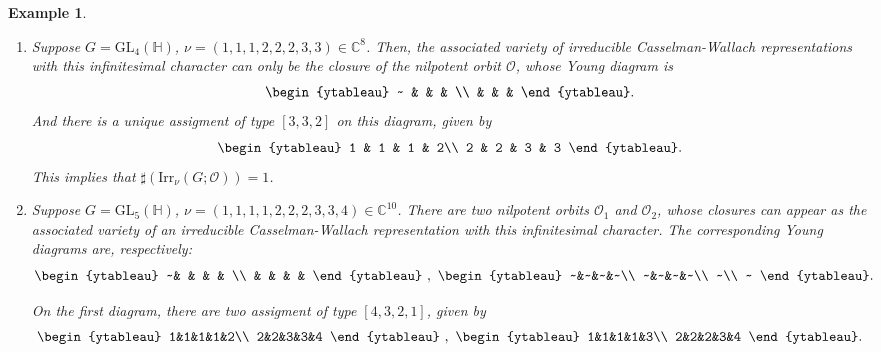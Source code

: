 \documentclass[12pt, a4paper]{amsart}
\numberwithin{equation}{section}
\newtheorem{examp}[thm]{Example}
\newcommand{\BC}{{\mathbb {C}}}
\newcommand{\BH}{{\mathbb {H}}}
\newcommand{\CO}{{\mathcal {O}}}
\newcommand{\GL}{{\mathrm{GL}}}
\newcommand{\Irr}{{\mathrm{Irr}}}
\begin{document}
\begin{examp}
    \begin{enumerate}
    \item  Suppose $G = \GL_{4}(\BH)$, $\nu = (1,1,1,2,2,2,3,3) \in \BC^{8}$.
           Then, the associated variety of irreducible Casselman-Wallach representations with this infinitesimal character can only be the closure of the nilpotent orbit $\CO$, whose Young diagram is
           \[
                \begin{ytableau}
                ~ & & & \\
                 & & & 
                \end{ytableau}.
           \]
            And there is a unique assigment of type $[3,3,2]$ on this diagram, given by
            \[
                \begin{ytableau}
                    1 & 1 & 1 & 2\\
                    2 & 2 & 3 & 3
                \end{ytableau}.
            \]
            This implies that $\sharp(\Irr_{\nu}(G;\CO)) = 1$.

    \item   Suppose $G = \GL_{5}(\BH)$, $\nu = (1,1,1,1,2,2,2,3,3,4) \in \BC^{10}$.       
            There are two nilpotent orbits $\CO_1$ and $\CO_2$, whose closures can appear as the associated variety of an irreducible Casselman-Wallach representation with this infinitesimal character. The corresponding Young diagrams are, respectively:
            \[
                \begin{ytableau}
                    ~& & & & \\
                    & & & &
                \end{ytableau}
                ~,~
                \begin{ytableau}
                    ~&~&~&~\\
                    ~&~&~&~\\
                    ~\\
                    ~
                \end{ytableau}.
            \]
            
            On the first diagram, there are two assigment of type $[4,3,2,1]$, given by
            \[
                \begin{ytableau}
                    1&1&1&1&2\\
                    2&2&3&3&4
                \end{ytableau}
                ~,~
                \begin{ytableau}
                    1&1&1&1&3\\
                    2&2&2&3&4
                \end{ytableau}.
            \]
            

\end{enumerate}
\end{examp}
\end{document}
